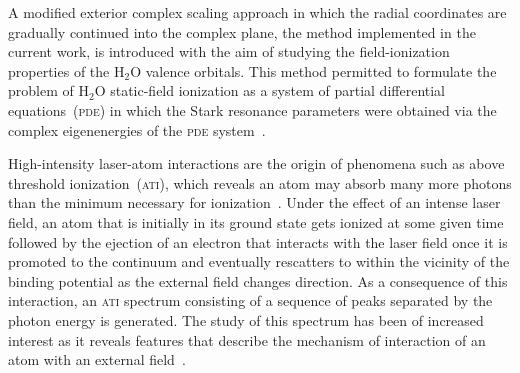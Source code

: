 
A modified exterior complex scaling approach in which the radial
coordinates are gradually continued into the complex plane, the method
implemented in the current work, is introduced with the aim of
studying the field-ionization properties of the H$_{2}$O valence
orbitals. This method permitted to formulate the problem of H$_{2}$O
static-field ionization as a system of partial differential
equations~(\textsc{pde}) in which the Stark resonance parameters were
obtained via the complex eigenenergies of the \textsc{pde}
system~\cite{sarias_2016,sarias_2017}.






High-intensity laser-atom interactions are the origin of phenomena
such as above threshold ionization~(\textsc{ati}), which reveals an
atom may absorb many more photons than the minimum necessary for
ionization~\cite{ATI1979}.
Under the effect of an intense laser field, an atom that is initially
in its ground state gets ionized at some given time followed by the
ejection of an electron that interacts with the laser field once it is
promoted to the continuum and eventually rescatters to within the
vicinity of the binding potential as the external field changes
direction. As a consequence of this interaction, an \textsc{ati}
spectrum consisting of a sequence of peaks separated by the photon
energy is generated. The study of this spectrum has been of increased
interest as it reveals features that describe the mechanism of
interaction of an atom with an external
field~\cite{BeckerRescattering_2018,Becker_ati2002}.

